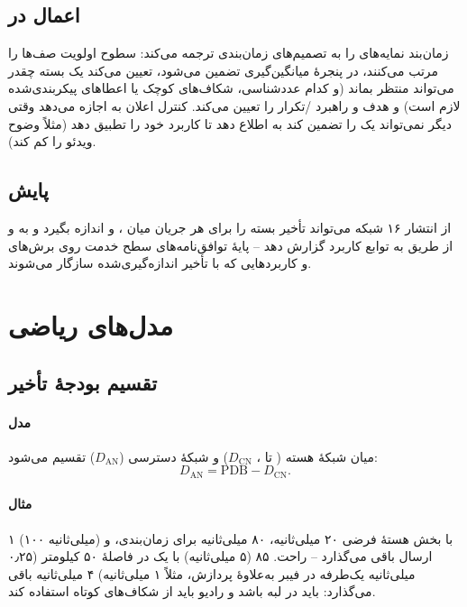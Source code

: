 \documentclass[11pt,a4paper]{article}
\begin{document}
\subsection{اعمال در }
زمان‌بند  نمایه‌های  را به تصمیم‌های زمان‌بندی ترجمه می‌کند: سطوح اولویت صف‌ها را مرتب می‌کنند،  در پنجرهٔ
میانگین‌گیری تضمین می‌شود،  تعیین می‌کند یک بسته چقدر می‌تواند منتظر بماند (و کدام عددشناسی، شکاف‌های کوچک یا اعطاهای
پیکربندی‌شده لازم است) و   هدف و راهبرد /تکرار را تعیین می‌کند. کنترل اعلان  به  اجازه
می‌دهد وقتی دیگر نمی‌تواند یک  را تضمین کند به  اطلاع دهد تا کاربرد خود را تطبیق دهد (مثلاً وضوح ویدئو را کم کند).

\subsection{پایش }
از انتشار ۱۶ شبکه می‌تواند تأخیر بسته را برای هر جریان  میان ،  و  اندازه بگیرد و به  و از طریق
 به توابع کاربرد گزارش دهد -- پایهٔ توافق‌نامه‌های سطح خدمت روی برش‌های  و کاربردهایی که با تأخیر اندازه‌گیری‌شده سازگار
می‌شوند.

\section{مدل‌های ریاضی}

\subsection{تقسیم بودجهٔ تأخیر}\label{sec:pdb}
\paragraph{مدل}  میان شبکهٔ هسته ( تا ، $D_{\mathrm{CN}}$) و شبکهٔ دسترسی ($D_{\mathrm{AN}}$) تقسیم می‌شود:
\begin{equation}\label{eq:pdb}
  D_{\mathrm{AN}} = \mathrm{PDB} - D_{\mathrm{CN}} .
\end{equation}
\paragraph{مثال}  ۱ (۱۰۰ میلی‌ثانیه) با بخش هستهٔ فرضی ۲۰ میلی‌ثانیه، ۸۰ میلی‌ثانیه برای زمان‌بندی،  و ارسال باقی
می‌گذارد -- راحت.  ۸۵ (۵ میلی‌ثانیه) با یک  در فاصلهٔ ۵۰ کیلومتر (۰٫۲۵ میلی‌ثانیه یک‌طرفه در فیبر به‌علاوهٔ پردازش، مثلاً ۱
میلی‌ثانیه) ۴ میلی‌ثانیه باقی می‌گذارد:  باید در لبه باشد و رادیو باید از شکاف‌های کوتاه استفاده کند.
\end{document}
